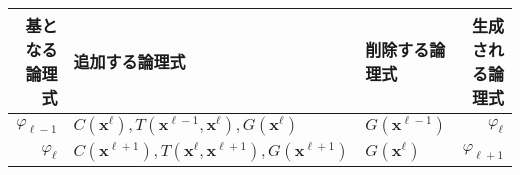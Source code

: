 \begin{tabular}{r|ll|r}
  基となる論理式 & 追加する論理式 & 削除する論理式 & 生成される論理式 \\ \hline
  $\varphi_{\ell-1}$ & $C(\bm{x}^{\ell}), T(\bm{x}^{\ell-1},\bm{x}^{\ell}), G(\bm{x}^\ell)$ 
    & $G(\bm{x}^{\ell-1})$ & $\varphi_{\ell}$ \\
    $\varphi_{\ell}$ & $C(\bm{x}^{\ell+1}), T(\bm{x}^{\ell},\bm{x}^{\ell+1}), G(\bm{x}^{\ell+1})$ 
    & $G(\bm{x}^{\ell})$ & $\varphi_{\ell+1}$ \\ 
\end{tabular}